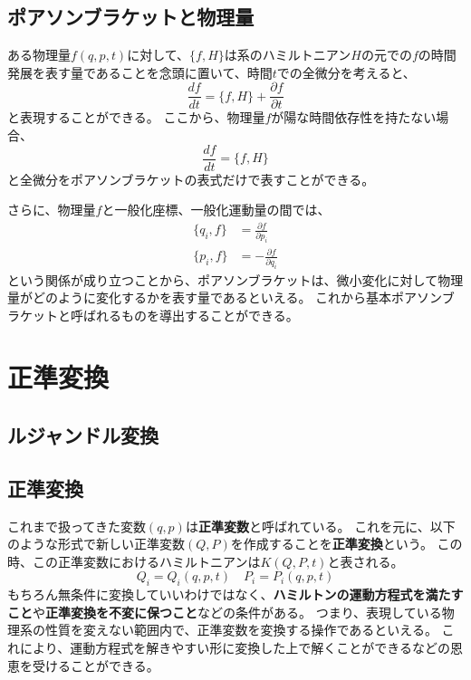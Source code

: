 \documentclass[a4paper]{jsreport}
\begin{document}
        \section{ポアソンブラケットと物理量}
            ある物理量$f(q, p ,t)$に対して、$\{ {f, H} \}$は系のハミルトニアン$H$の元での$f$の時間発展を表す量であることを念頭に置いて、時間$t$での全微分を考えると、
            \begin{equation}
                \frac{df}{dt} = \{f, H\} + \frac{\partial f}{\partial t}
            \end{equation}
            と表現することができる。
            ここから、物理量$f$が陽な時間依存性を持たない場合、
            \begin{equation}
                \frac{df}{dt} = \{f, H\}
            \end{equation}
            と全微分をポアソンブラケットの表式だけで表すことができる。\par
            さらに、物理量$f$と一般化座標、一般化運動量の間では、
            \begin{align}
                \{ q_i, f \} &= \frac{\partial f}{\partial p_i} \\
                \{ p_i, f \} &= - \frac{\partial f}{\partial q_i}
            \end{align}
            という関係が成り立つことから、ポアソンブラケットは、微小変化に対して物理量がどのように変化するかを表す量であるといえる。
            これから基本ポアソンブラケットと呼ばれるものを導出することができる。


    \chapter{正準変換}
        \section{ルジャンドル変換}
        \section{正準変換}
            これまで扱ってきた変数$(q, p)$は\textbf{正準変数}と呼ばれている。
            これを元に、以下のような形式で新しい正準変数$(Q, P)$を作成することを\textbf{正準変換}という。
            この時、この正準変数におけるハミルトニアンは$K(Q, P, t)$と表される。
            \begin{equation}
                Q_i = Q_i(q, p, t) \quad P_i = P_i(q, p, t)
            \end{equation}
            もちろん無条件に変換していいわけではなく、\textbf{ハミルトンの運動方程式を満たすこと}や\textbf{正準変換を不変に保つこと}などの条件がある。
            つまり、表現している物理系の性質を変えない範囲内で、正準変数を変換する操作であるといえる。
            これにより、運動方程式を解きやすい形に変換した上で解くことができるなどの恩恵を受けることができる。
\end{document}
